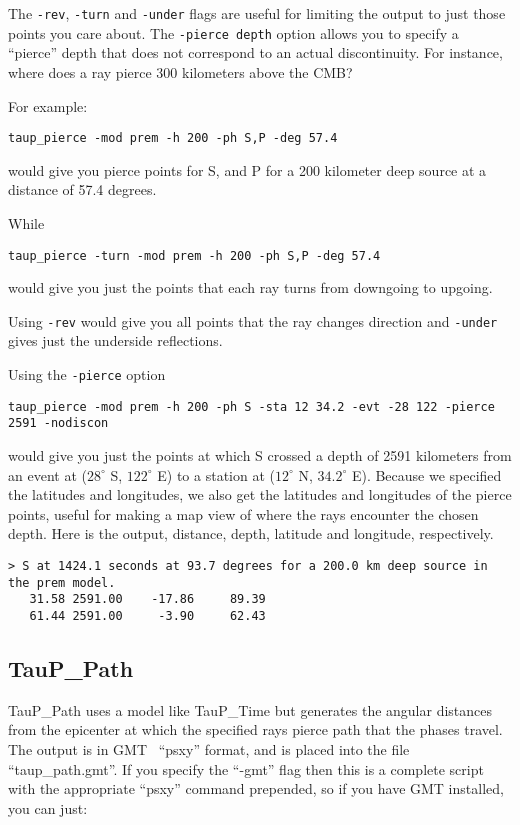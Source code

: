 The \texttt{-rev}, \texttt{-turn} and \texttt{-under} flags are useful 
for limiting the output
to just those points you care about. The \texttt{-pierce depth} option 
allows you
to specify a ``pierce'' depth that does not correspond to an
actual discontinuity. For instance, where does a ray pierce 300 kilometers
above the CMB?

For example:

\texttt{taup\_pierce -mod prem -h 200 -ph S,P -deg 57.4}

would give you pierce points for S, and P for a 200 kilometer
deep source at a distance of 57.4 degrees. 

While

\texttt{taup\_pierce -turn -mod prem -h 200 -ph S,P -deg 57.4}

would give you just the points that each ray turns from downgoing to upgoing.

Using \texttt{-rev} would give you all points that the ray changes direction and \texttt{-under} gives just the underside reflections. 

Using the \texttt{-pierce} option

\texttt{taup\_pierce -mod prem -h 200 -ph S -sta 12 34.2 -evt -28 122 -pierce 2591 -nodiscon}

would give you just the points at which S crossed a depth of 2591 kilometers
from an event at ($28^\circ$ S, $122^\circ$ E)
to a station at ($12^\circ$ N, $34.2^\circ$ E). 
Because we specified the latitudes and longitudes, we also get the 
latitudes and longitudes of 
the pierce points, useful for making
a map view of where the rays encounter the chosen depth. Here is the output,
distance, depth, latitude and longitude, respectively.
\begin{verbatim}
> S at 1424.1 seconds at 93.7 degrees for a 200.0 km deep source in the prem model.
   31.58 2591.00    -17.86     89.39
   61.44 2591.00     -3.90     62.43
\end{verbatim}

\subsection{TauP\_Path}
TauP\_Path uses a model like TauP\_Time but
generates  the
angular distances from the epicenter at which the specified rays pierce 
path that the phases travel. The output is in GMT~\cite{GMT} ``psxy'' format, and is
placed into the file ``taup\_path.gmt''. 
If you specify the ``-gmt'' flag then this 
is a complete script with the appropriate ``psxy'' command prepended, so if you
have GMT installed, you can just:

